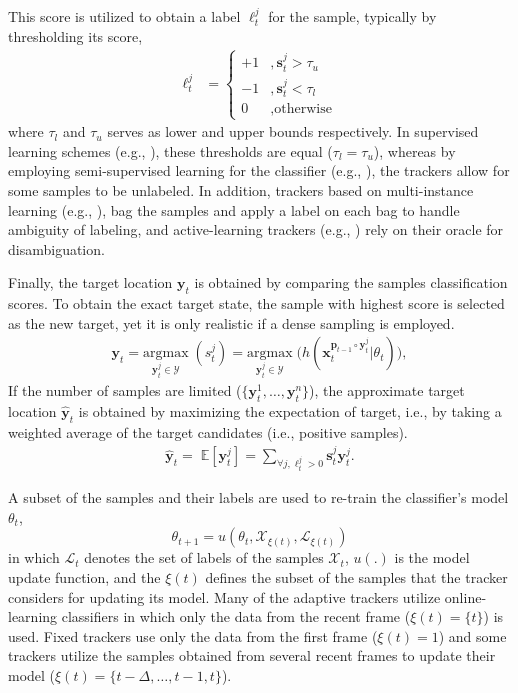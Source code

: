 \documentclass[10pt, conference, compsocconf]{IEEEtran}
\begin{document}
This score is utilized to obtain a label $\ell^j_t$ for the sample, typically by thresholding its score,
\begin{align}
\ell^j_t &=
  \begin{cases}
   +1        & ,\mathbf{s}^j_t > \tau_u \\
   -1        & ,\mathbf{s}^j_t < \tau_l \\
   0         & ,\text{otherwise}
  \end{cases}
  \label{eq:label_single}
\end{align}
where $\tau_l$ and $\tau_u$ serves as lower and upper bounds respectively. In supervised learning schemes (e.g., \cite{grabner2006real}), these thresholds are equal ($\tau_l = \tau_u$), whereas by employing semi-supervised learning for the classifier (e.g., \cite{grabner2008semi,saffari2010robust}), the trackers allow for some samples to be unlabeled. In addition, trackers based on multi-instance learning (e.g., \cite{babenko2009visual,zhang2013robust}), bag the samples and apply a label on each bag to handle ambiguity of labeling, and active-learning trackers (e.g., \cite{meshgi2016robust}) rely on their oracle for disambiguation. 

Finally, the target location $\mathbf{y}_t$ is obtained by comparing the samples classification scores. To obtain the exact target state, the sample with highest score is selected as the new target, yet it is only realistic if a dense sampling is employed. 
\begin{align}
\mathbf{y}_t = \underset{\mathbf{y}_t^j \in \mathcal{Y}}{\mathrm{argmax}} \; ( s_t^j ) = \underset{\mathbf{y}_t^j \in \mathcal{Y}}{\mathrm{argmax}} \; \big( h(\mathbf{x}_t^{\mathbf{p}_{t-1} \circ \mathbf{y}_t^j} | \theta_t) \big),
\label{eq:localize_single}
\end{align}
If the number of samples are limited ($\{ \mathbf{y}^1_t, \ldots, \mathbf{y}^n_t \}$), the approximate target location $\mathbf{\hat{y}}_t$ is obtained by maximizing the expectation of target, i.e., by taking a weighted average of the target candidates (i.e., positive samples).
\begin{align}
\mathbf{\hat{y}}_t = \;\mathbb{E} [ \mathbf{y}_t^j ] = \sum_{\forall j, \ell^j_t>0} \mathbf{s}^j_t \mathbf{y}_t^j.
\label{eq:localize_approx}
\end{align}

A subset of the samples and their labels are used to re-train the classifier's model $\theta_t$,
\begin{equation}
\theta_{t+1} = u(\theta_t, \mathcal{X}_{\xi(t)}, \mathcal{L}_{\xi(t)})
\end{equation}
in which $\mathcal{L}_t$ denotes the set of labels of the samples $\mathcal{X}_t$, $u(.)$ is the model update function, and the $\xi(t)$ defines the subset of the samples that the tracker considers for updating its model. Many of the adaptive trackers utilize online-learning classifiers \cite{hare2011struck,ross2008incremental} in which only the data from the recent frame ($\xi(t)=\{t\}$) is used. Fixed trackers use only the data from the first frame ($\xi(t) = {1}$) and some trackers utilize the samples obtained from several recent frames to update their model ($\xi(t) = \{t-\Delta, \ldots, t-1, t \}$).
\end{document}
